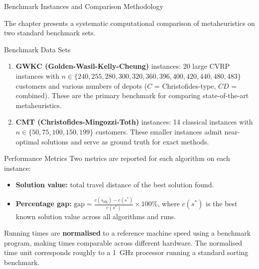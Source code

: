 \documentclass[aspectratio=169,10pt]{beamer}
\begin{document}
\begin{frame}[allowframebreaks]{Benchmark Instances and Comparison Methodology}

  The chapter presents a systematic computational comparison of
  metaheuristics on two standard benchmark sets.

  \begin{block}{Benchmark Data Sets}
    \begin{enumerate}
      \item \textbf{GWKC (Golden-Wasil-Kelly-Cheung)} instances: 20 large
            CVRP instances with $n \in \{240, 255, 280, 300, 320, 360, 396,
            400, 420, 440, 480, 483\}$ customers and various numbers of
            depots ($C$ = Christofides-type, $CD$ = combined).  These are
            the primary benchmark for comparing state-of-the-art
            metaheuristics.
      \item \textbf{CMT (Christofides-Mingozzi-Toth)} instances: 14
            classical instances with $n \in \{50, 75, 100, 150, 199\}$
            customers.  These smaller instances admit near-optimal
            solutions and serve as ground truth for exact methods.
    \end{enumerate}
  \end{block}

  \begin{block}{Performance Metrics}
    Two metrics are reported for each algorithm on each instance:
    \begin{itemize}
      \item \textbf{Solution value:} total travel distance of the best
            solution found.
      \item \textbf{Percentage gap:}
            $\displaystyle \text{gap} =
            \frac{c(s_{\text{alg}}) - c(s^*)}{c(s^*)} \times 100\%$,
            where $c(s^*)$ is the best known solution value across
            all algorithms and runs.
    \end{itemize}
    Running times are \textbf{normalised} to a reference machine speed
    using a benchmark program, making times comparable across different
    hardware.  The normalised time unit corresponds roughly to a 1~GHz
    processor running a standard sorting benchmark.
  \end{block}

  \framebreak


\end{frame}
\end{document}
